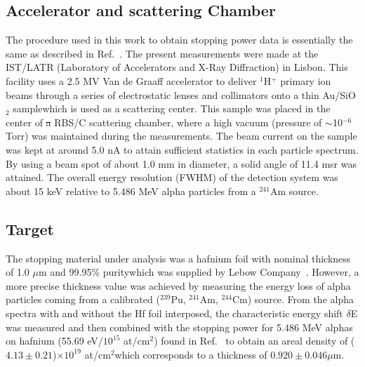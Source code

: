 \documentclass[aps,pra,reprint,superscriptaddress]{revtex4-1}
\providecommand{\DIFadd}[1]{{\protect\color{blue}\uwave{#1}}} %
\providecommand{\DIFdel}[1]{{\protect\color{red}\sout{#1}}}                      %
\providecommand{\DIFaddbegin}{} %
\providecommand{\DIFaddend}{} %
\providecommand{\DIFdelbegin}{} %
\providecommand{\DIFdelend}{} %
\newcommand{\DIFscaledelfig}{0.5}
\newlength{\DIFdelgraphicswidth} %
\newlength{\DIFdelgraphicsheight} %
\newcommand{\DIFaddincludegraphics}[2][]{{\color{blue}\fbox{\DIFOincludegraphics[#1]{#2}}}} %
\newcommand{\DIFdelincludegraphics}[2][]{%
\sbox{\DIFdelgraphicsbox}{\DIFOincludegraphics[#1]{#2}}%
\settoboxwidth{\DIFdelgraphicswidth}{\DIFdelgraphicsbox} %
\settoboxtotalheight{\DIFdelgraphicsheight}{\DIFdelgraphicsbox} %
\scalebox{\DIFscaledelfig}{%
\parbox[b]{\DIFdelgraphicswidth}{\usebox{\DIFdelgraphicsbox}\\[-\baselineskip] \rule{\DIFdelgraphicswidth}{0em}}\llap{\resizebox{\DIFdelgraphicswidth}{\DIFdelgraphicsheight}{%
\setlength{\unitlength}{\DIFdelgraphicswidth}%
\begin{picture}(1,1)%
\thicklines\linethickness{2pt} %
{\color[rgb]{1,0,0}\put(0,0){\framebox(1,1){}}}%
{\color[rgb]{1,0,0}\put(0,0){\line( 1,1){1}}}%
{\color[rgb]{1,0,0}\put(0,1){\line(1,-1){1}}}%
\end{picture}%
}\hspace*{3pt}}} %
} %
\DeclareRobustCommand{\DIFaddbegin}{\DIFOaddbegin \let\includegraphics\DIFaddincludegraphics} %
\DeclareRobustCommand{\DIFaddend}{\DIFOaddend \let\includegraphics\DIFOincludegraphics} %
\DeclareRobustCommand{\DIFdelbegin}{\DIFOdelbegin \let\includegraphics\DIFdelincludegraphics} %
\DeclareRobustCommand{\DIFdelend}{\DIFOaddend \let\includegraphics\DIFOincludegraphics} %
\begin{document}
\subsection{Accelerator and scattering Chamber}
The procedure used in this work to obtain stopping power data is 
essentially the same as described in Ref.~\cite{Miranda01}. The present 
measurements were made at the IST/LATR (Laboratory of Accelerators and 
X-Ray Diffraction) in Lisbon. This facility uses a 2.5 MV Van de Graaff 
accelerator to deliver $^1$H$^+$ primary ion beams through a series of 
electrostatic lenses and collimators onto a thin Au/SiO$_2$ sample\DIFaddbegin \DIFadd{, 
}\DIFaddend which is used as a scattering center. This sample was placed in the 
center of \DIFdelbegin \DIFdel{a }\DIFdelend \DIFaddbegin \DIFadd{an }\DIFaddend RBS/C scattering chamber, where a high vacuum (pressure of 
$\sim$10$^{-6}$ Torr) was maintained during the measurements. The beam 
current on the sample was kept at around 5.0 nA to attain sufficient 
statistics in each particle spectrum. By using a beam spot of about 
1.0 mm in diameter, a solid angle of 11.4 msr was attained. The overall 
energy resolution (FWHM) of the detection system was about 15 keV 
relative to 5.486 MeV alpha particles from a $^{241}$Am source.

\subsection{Target}
The stopping material under analysis was a hafnium foil with \DIFaddbegin \DIFadd{a }\DIFaddend nominal 
thickness of 1.0 $\mu$m and 99.95\% purity\DIFaddbegin \DIFadd{, }\DIFaddend which was supplied by Lebow 
Company~\cite{Lebow}. However, a more precise thickness value was 
achieved by measuring the energy loss of alpha particles coming from a 
calibrated ($^{239}$Pu, $^{241}$Am, $^{244}$Cm) source. From the alpha 
spectra with and without the Hf foil interposed, the characteristic 
energy shift $\delta$E was measured and then combined with the stopping 
power for 5.486 MeV alphas on hafnium (55.69 eV/$10^{15}$ at/cm$^2$) 
found in Ref.~\cite{Ziegler01} to obtain an areal density of 
($4.13 \pm 0.21$)$\times 10^{19}$ at/cm$^2$\DIFaddbegin \DIFadd{, }\DIFaddend which corresponds to a 
thickness of $0.920\pm0.046 \mu$m.

\end{document}
